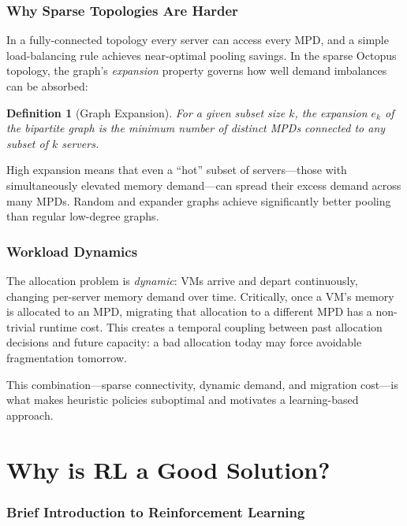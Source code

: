 \documentclass[11pt]{article}
\newtheorem{definition}{Definition}
\begin{document}
\subsubsection*{Why Sparse Topologies Are Harder}

In a fully-connected topology every server can access every MPD, and a simple
load-balancing rule achieves near-optimal pooling savings.  In the sparse
Octopus topology, the graph's \emph{expansion} property governs how well
demand imbalances can be absorbed:

\begin{definition}[Graph Expansion]
For a given subset size $k$, the expansion $e_k$ of the bipartite graph is
the minimum number of distinct MPDs connected to any subset of $k$ servers.
\end{definition}

High expansion means that even a ``hot'' subset of servers---those with
simultaneously elevated memory demand---can spread their excess demand across
many MPDs.  Random and expander graphs achieve significantly better pooling
than regular low-degree graphs.

\subsubsection*{Workload Dynamics}

The allocation problem is \emph{dynamic}: VMs arrive and depart continuously,
changing per-server memory demand over time.  Critically, once a VM's memory is
allocated to an MPD, migrating that allocation to a different MPD has a
non-trivial runtime cost.  This creates a temporal coupling between past
allocation decisions and future capacity: a bad allocation today may force
avoidable fragmentation tomorrow.

This combination---sparse connectivity, dynamic demand, and migration cost---is
what makes heuristic policies suboptimal and motivates a learning-based
approach.

\section{Why is RL a Good Solution?}

\subsubsection*{Brief Introduction to Reinforcement Learning}
\end{document}
